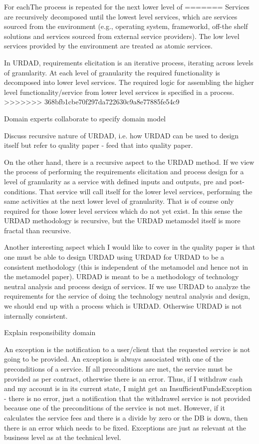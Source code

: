 For eachThe process is repeated for the next lower level of
=======
Services are recursively decomposed until the lowest level services, which are services sourced from the environment (e.g., operating system, frameworkd, off-the shelf solutions and services sourced from external service providers). The low level services provided by the environment are treated as atomic services.

In URDAD, requirements elicitation is an iterative process, iterating across levels of granularity. At each level of granularity the required functionality is decomposed into lower level services. The required logic for assembling the higher level functionality/service from lower level services is specified in a process.
>>>>>>> 368bfb1cbe70f297da722630c9a8e77885fe54c9

Domain experts collaborate to specify domain model

Discuss recursive nature of URDAD, i.e. how URDAD can be used to design itself but refer to quality paper - feed that into quality paper.

On the other hand, there is a recursive aspect to the URDAD method. If
we view the process of performing the requirements elicitation and
process design for  a level of granularity as a service with defined
inputs and outputs, pre and post-conditions. That service will call
itself for the lower level services, performing the same activities at
the next lower level of granularity. That is of course only required for
those lower level services which do not yet exist. In this sense the
URDAD methodology is recursive, but the URDAD metamodel itself is more
fractal than recursive.

Another interesting aspect which I would like to cover in the quality
paper is that one must be able to design URDAD using URDAD for URDAD to
be a consistent methodology (this is independent of the metamodel and
hence not in the metamodel paper). URDAD is meant to be a methodology of
technology neutral analysis and process design of services. If we use
URDAD to analyze the requirements for the service of doing the
technology neutral analysis and design, we should end up with a process
which is URDAD. Otherwise URDAD is not internally consistent.


Explain responsibility domain

An exception is the notification to a user/client that the requested service is not going to be provided. An exception is always associated with one of the preconditions of a service. If all preconditions are met, the service must be provided as per contract, otherwise there is an error. Thus, if I withdraw cash and my account is in its current state, I might get an InsufficientFundsException - there is no error, just a notification that the withdrawel service is not provided because one of the preconditions of the service is not met. However, if it calculates the service fees and there is a divide by zero or the DB is down, then there is an error which needs to be fixed. Exceptions are just as relevant at the business level as at the technical level.





